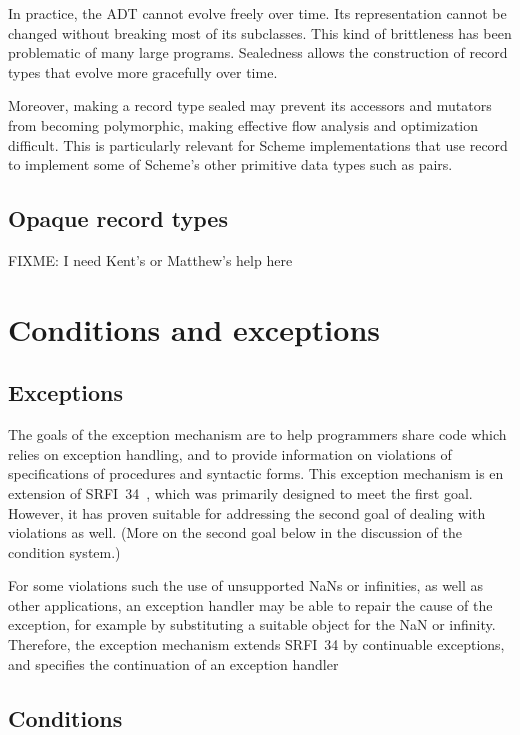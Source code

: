 \documentclass[twoside,twocolumn]{algol60}
\begin{document}
In practice, the ADT cannot evolve freely over time.  Its
representation cannot be changed without breaking most of its
subclasses.  This kind of brittleness has been problematic of many
large programs.  Sealedness allows the construction of record types
that evolve more gracefully over time.

Moreover, making a record type sealed may prevent its accessors and
mutators from becoming polymorphic, making effective flow analysis and
optimization difficult.  This is particularly relevant for
Scheme implementations that use record to implement some of Scheme's
other primitive data types such as pairs.

\section{Opaque record types}

FIXME: I need Kent's or Matthew's help here

\chapter{Conditions and exceptions}

\section{Exceptions}

The goals of the exception mechanism are to help programmers share
code which relies on exception handling, and to provide information on
violations of specifications of procedures and syntactic forms.  This
exception mechanism is en extension of SRFI~34~\cite{srfi34}, which
was primarily designed to meet the first goal.  However, it has proven
suitable for addressing the second goal of dealing with violations as
well.   (More on the second goal below in the discussion of the
condition system.)

For some violations such the use of unsupported NaNs or infinities, as
well as other applications, an exception handler may be able to
repair the cause of the exception, for example by substituting a
suitable object for the NaN or infinity.  Therefore, the exception
mechanism extends SRFI~34 by continuable exceptions, and specifies the
continuation of an exception handler

\section{Conditions}
\end{document}
